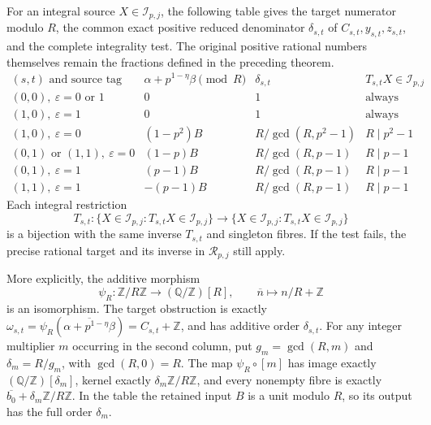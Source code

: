 \begin{theorem}
\label{thm:boundary-obstruction-fibres}
For an integral source \(X\in\mathcal I_{p,j}\), the following
table gives the target numerator modulo \(R\), the common exact
positive reduced denominator \(\delta_{s,t}\) of
\(C_{s,t},y_{s,t},z_{s,t}\), and the complete integrality test.
The original positive rational numbers themselves remain the
fractions defined in the preceding theorem.
\[
\begin{array}{c|c|c|c}
 (s,t)\text{ and source tag}&
 \alpha+p^{1-\eta}\beta\pmod R&\delta_{s,t}&
 T_{s,t}X\in\mathcal I_{p,j}\\\hline
 (0,0),\ \varepsilon=0\text{ or }1&0&1&\text{always}\\
 (1,0),\ \varepsilon=1&0&1&\text{always}\\
 (1,0),\ \varepsilon=0&(1-p^2)B&
 R/\gcd(R,p^2-1)&R\mid p^2-1\\
 (0,1)\text{ or }(1,1),\ \varepsilon=0&(1-p)B&
 R/\gcd(R,p-1)&R\mid p-1\\
 (0,1),\ \varepsilon=1&(p-1)B&
 R/\gcd(R,p-1)&R\mid p-1\\
 (1,1),\ \varepsilon=1&-(p-1)B&
 R/\gcd(R,p-1)&R\mid p-1
\end{array}
\]
Each integral restriction
\[
 T_{s,t}:\{X\in\mathcal I_{p,j}:T_{s,t}X\in\mathcal I_{p,j}\}
   \longrightarrow
 \{X\in\mathcal I_{p,j}:T_{s,t}X\in\mathcal I_{p,j}\}
\]
is a bijection with the same inverse \(T_{s,t}\) and singleton
fibres. If the test fails, the precise rational target and its
inverse in \(\mathcal R_{p,j}\) still apply.

More explicitly, the additive morphism
\[
 \psi_R:\mathbb Z/R\mathbb Z\longrightarrow
      (\mathbb Q/\mathbb Z)[R],\qquad
 \overline n\longmapsto n/R+\mathbb Z
\]
is an isomorphism. The target obstruction is exactly
\(\omega_{s,t}=\psi_R(\overline{\alpha+p^{1-\eta}\beta})
 =C_{s,t}+\mathbb Z\), and has additive order
\(\delta_{s,t}\). For any integer multiplier \(m\) occurring
in the second column, put \(g_m=\gcd(R,m)\) and
\(\delta_m=R/g_m\), with \(\gcd(R,0)=R\).
The map \(\psi_R\circ[m]\) has image exactly
\((\mathbb Q/\mathbb Z)[\delta_m]\), kernel exactly
\(\delta_m\mathbb Z/R\mathbb Z\), and every nonempty fibre
is exactly \(\overline{b_0}+\delta_m\mathbb Z/R\mathbb Z\).
In the table the retained input \(B\) is a unit modulo \(R\),
so its output has the full order \(\delta_m\).
\end{theorem}
